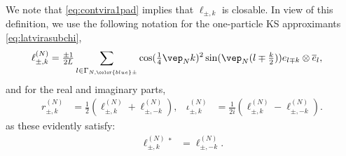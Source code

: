 \documentclass[a4paper, 11pt]{article}
\DeclareMathOperator{\1}{\mathds{1}}
\begin{document}
We note that \eqref{eq:contvira1pad} implies that $\ell_{\pm,k}$ is closable. In view of this definition, we use the following notation for the one-particle KS approximants \eqref{eq:latvirasubchi},
\begin{align}
\label{eq:latvira1p}
\ell^{(N)}_{\pm,k} & = \tfrac{\pm1}{2L}\sum_{l\in\Gamma_{N,{\color{blue}\pm}}}\cos(\tfrac{1}{4}\vep_{N}k)^{2}\sin(\vep_{N}(l\mp\tfrac{k}{2}))e_{l\mp k}\otimes \overline{e}_{l},
\end{align}
and for the real and imaginary parts,
\begin{align}
\label{eq:latvira1pRI}
r^{(N)}_{\pm,k} & = \tfrac{1}{2}(\ell^{(N)}_{\pm,k}+\ell^{(N)}_{\pm,-k}), & \iota^{(N)}_{\pm,k} & = \tfrac{1}{2i}(\ell^{(N)}_{\pm,k}-\ell^{(N)}_{\pm,-k}).
\end{align}
as these evidently satisfy:
\begin{align}
\label{eq:latvira1pad}
\ell^{(N)}_{\pm,k}{}^{*} & = \ell^{(N)}_{\pm,-k}.
\end{align}
\end{document}

